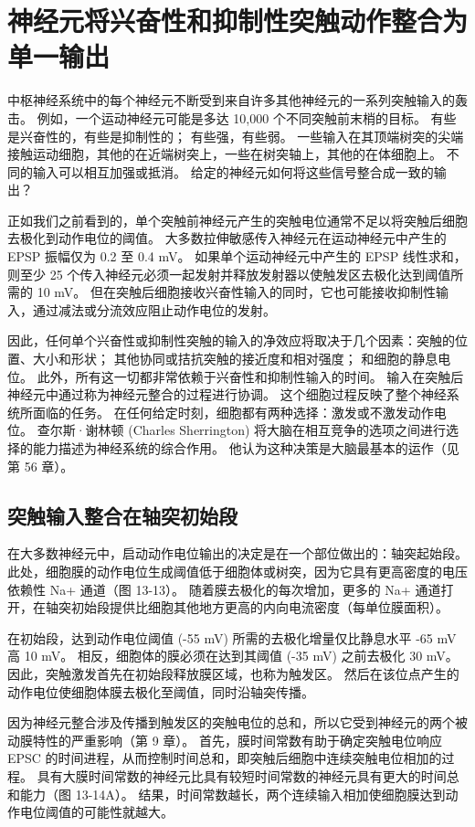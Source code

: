 \section{神经元将兴奋性和抑制性突触动作整合为单一输出}
中枢神经系统中的每个神经元不断受到来自许多其他神经元的一系列突触输入的轰击。 例如，一个运动神经元可能是多达 10,000 个不同突触前末梢的目标。 有些是兴奋性的，有些是抑制性的； 有些强，有些弱。 一些输入在其顶端树突的尖端接触运动细胞，其他的在近端树突上，一些在树突轴上，其他的在体细胞上。 不同的输入可以相互加强或抵消。 给定的神经元如何将这些信号整合成一致的输出？

正如我们之前看到的，单个突触前神经元产生的突触电位通常不足以将突触后细胞去极化到动作电位的阈值。 大多数拉伸敏感传入神经元在运动神经元中产生的 EPSP 振幅仅为 0.2 至 0.4 mV。 如果单个运动神经元中产生的 EPSP 线性求和，则至少 25 个传入神经元必须一起发射并释放发射器以使触发区去极化达到阈值所需的 10 mV。 但在突触后细胞接收兴奋性输入的同时，它也可能接收抑制性输入，通过减法或分流效应阻止动作电位的发射。

因此，任何单个兴奋性或抑制性突触的输入的净效应将取决于几个因素：突触的位置、大小和形状； 其他协同或拮抗突触的接近度和相对强度； 和细胞的静息电位。 此外，所有这一切都非常依赖于兴奋性和抑制性输入的时间。 输入在突触后神经元中通过称为神经元整合的过程进行协调。 这个细胞过程反映了整个神经系统所面临的任务。 在任何给定时刻，细胞都有两种选择：激发或不激发动作电位。 查尔斯·谢林顿 (Charles Sherrington) 将大脑在相互竞争的选项之间进行选择的能力描述为神经系统的综合作用。 他认为这种决策是大脑最基本的运作（见第 56 章）。

\subsection{突触输入整合在轴突初始段}
在大多数神经元中，启动动作电位输出的决定是在一个部位做出的：轴突起始段。 此处，细胞膜的动作电位生成阈值低于细胞体或树突，因为它具有更高密度的电压依赖性 Na+ 通道（图 13-13）。 随着膜去极化的每次增加，更多的 Na+ 通道打开，在轴突初始段提供比细胞其他地方更高的内向电流密度（每单位膜面积）。

在初始段，达到动作电位阈值 (-55 mV) 所需的去极化增量仅比静息水平 -65 mV 高 10 mV。 相反，细胞体的膜必须在达到其阈值 (-35 mV) 之前去极化 30 mV。 因此，突触激发首先在初始段释放膜区域，也称为触发区。 然后在该位点产生的动作电位使细胞体膜去极化至阈值，同时沿轴突传播。

因为神经元整合涉及传播到触发区的突触电位的总和，所以它受到神经元的两个被动膜特性的严重影响（第 9 章）。 首先，膜时间常数有助于确定突触电位响应 EPSC 的时间进程，从而控制时间总和，即突触后细胞中连续突触电位相加的过程。 具有大膜时间常数的神经元比具有较短时间常数的神经元具有更大的时间总和能力（图 13-14A）。 结果，时间常数越长，两个连续输入相加使细胞膜达到动作电位阈值的可能性就越大。

